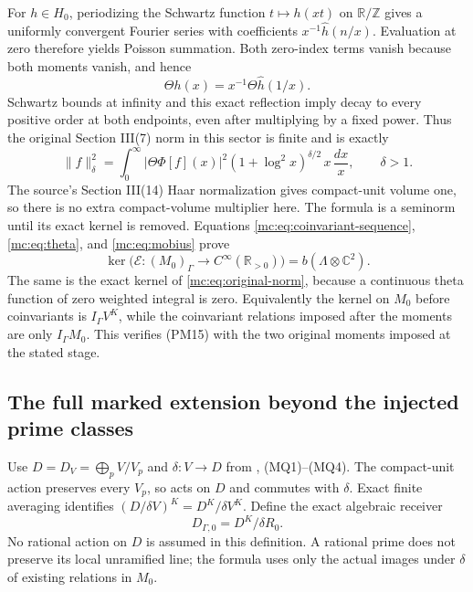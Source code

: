 \documentclass[11pt,a4paper]{article}
\theoremstyle{definition}\newtheorem{definition}[theorem]{Definition}
\newcommand{\Z}{\mathbb Z}\newcommand{\Q}{\mathbb Q}
\newcommand{\C}{\mathbb C}\newcommand{\R}{\mathbb R}
\begin{document}
For $h\in H_0$, periodizing the Schwartz function $t\mapsto h(xt)$
on $\mathbb R/\Z$ gives a uniformly convergent Fourier series
with coefficients $x^{-1}\widehat h(n/x)$. Evaluation at zero
therefore yields Poisson summation. Both zero-index terms vanish
because both moments vanish, and hence
\[
 \Theta h(x)=x^{-1}\Theta\widehat h(1/x).
 \tag{MC17}\label{mc:eq:poisson}
\]
Schwartz bounds at infinity and this exact reflection imply decay
to every positive order at both endpoints, even after multiplying
by a fixed power. Thus the original Section III(7) norm in this
sector is finite and is exactly
\[
 \|f\|_\delta^2=
 \int_0^\infty|\Theta\Phi[f](x)|^2
        (1+\log^2x)^{\delta/2}\,x\,\frac{dx}{x},
 \qquad\delta>1.
 \tag{MC18}\label{mc:eq:original-norm}
\]
The source's Section III(14) Haar normalization gives compact-unit
volume one, so there is no extra compact-volume multiplier here.
The formula is a seminorm until its exact kernel is removed.
Equations \eqref{mc:eq:coinvariant-sequence}, \eqref{mc:eq:theta}, and
\eqref{mc:eq:mobius} prove
\[
 \ker\bigl(\mathcal E:(M_0)_\Gamma\to
                        C^\infty(\mathbb R_{>0})\bigr)
   =b(\Lambda\otimes\C^2).
 \tag{MC19}\label{mc:eq:theta-kernel}
\]
The same is the exact kernel of \eqref{mc:eq:original-norm}, because
a continuous theta function of zero weighted integral is zero.
Equivalently the kernel on $M_0$ before coinvariants is
$I_\Gamma V^K$, while the coinvariant relations imposed after
the moments are only $I_\Gamma M_0$. This verifies (PM15) with
the two original moments imposed at the stated stage.

\subsection{The full marked extension beyond the injected prime classes}

Use $D=D_V=\bigoplus_p V/V_p$ and $\delta:V\to D$ from
, (MQ1)--(MQ4).
The compact-unit action preserves every $V_p$, so acts on $D$ and
commutes with $\delta$. Exact finite averaging identifies
$(D/\delta V)^K=D^K/\delta V^K$. Define the exact algebraic
receiver
\[
 D_{\Gamma,0}=D^K/\delta R_0.
 \tag{MC20}\label{mc:eq:marked-coinvariant-receiver}
\]
No rational action on $D$ is assumed in this definition. A rational
prime does not preserve its local unramified line; the formula
uses only the actual images under $\delta$ of existing relations
in $M_0$.
\end{document}
